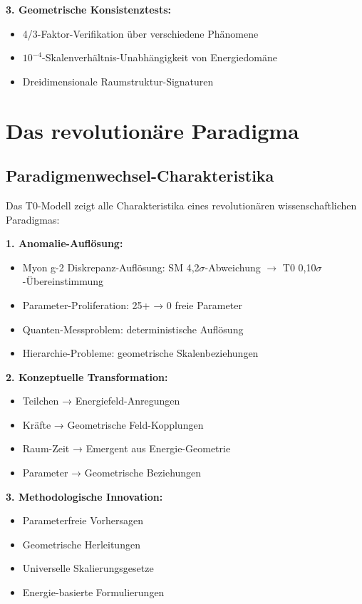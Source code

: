 \documentclass[12pt,a4paper]{report}
\begin{document}
	\textbf{3. Geometrische Konsistenztests:}
	\begin{itemize}
		\item 4/3-Faktor-Verifikation über verschiedene Phänomene
		\item $10^{-4}$-Skalenverhältnis-Unabhängigkeit von Energiedomäne
		\item Dreidimensionale Raumstruktur-Signaturen
	\end{itemize}
	
	\section{Das revolutionäre Paradigma}
	\label{sec:revolutionary_paradigm}
	
	\subsection{Paradigmenwechsel-Charakteristika}
	\label{subsec:paradigm_shift_characteristics}
	
	Das T0-Modell zeigt alle Charakteristika eines revolutionären wissenschaftlichen Paradigmas:
	
	\textbf{1. Anomalie-Auflösung:}
	\begin{itemize}
		\item Myon g-2 Diskrepanz-Auflösung: SM 4,2$\sigma$-Abweichung $\rightarrow$ T0 0,10$\sigma$-Übereinstimmung
		\item Parameter-Proliferation: 25+ → 0 freie Parameter
		\item Quanten-Messproblem: deterministische Auflösung
		\item Hierarchie-Probleme: geometrische Skalenbeziehungen
	\end{itemize}
	
	\textbf{2. Konzeptuelle Transformation:}
	\begin{itemize}
		\item Teilchen → Energiefeld-Anregungen
		\item Kräfte → Geometrische Feld-Kopplungen
		\item Raum-Zeit → Emergent aus Energie-Geometrie
		\item Parameter → Geometrische Beziehungen
	\end{itemize}
	
	\textbf{3. Methodologische Innovation:}
	\begin{itemize}
		\item Parameterfreie Vorhersagen
		\item Geometrische Herleitungen
		\item Universelle Skalierungsgesetze
		\item Energie-basierte Formulierungen
	\end{itemize}
	
\end{document}

